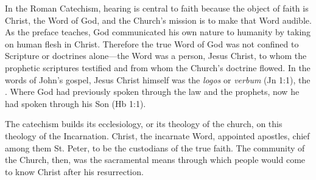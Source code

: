 In the Roman Catechism, hearing is central to faith because the object of faith
is Christ, the Word of God, and the Church's mission is to make that Word
audible.
As the preface teaches, God communicated his own nature to humanity by taking on
human flesh in Christ.
Therefore the true Word of God was not confined to Scripture or doctrines
alone---the Word was a person, Jesus Christ, to whom the prophetic scriptures
testified and from whom the Church's doctrine flowed.%
    \Autocite
    [9: .]
    {Catholic:Catechismus1614}
In the words of John's gospel, Jesus Christ himself was the \emph{logos} or
\emph{verbum} (Jn 1:1), the .
Where God had previously spoken through the law and the prophets, now he had
spoken through his Son (Hb 1:1).

The catechism builds its ecclesiology, or its theology of the church, on this
theology of the Incarnation.
Christ, the incarnate Word, appointed apostles, chief among them St. Peter, to
be the custodians of the true faith.
The community of the Church, then, was the sacramental means through which
people would come to know Christ after his resurrection.

